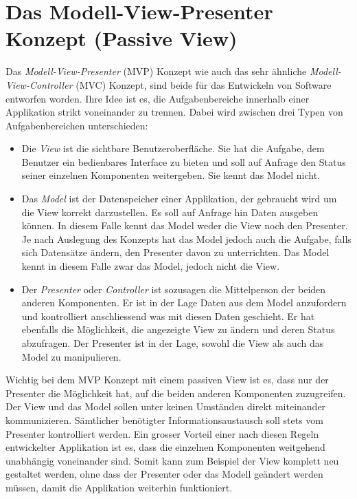 \documentclass[../main.tex]{subfiles}
\begin{document}
\section{Das Modell-View-Presenter Konzept (Passive View)} \label{mvp}
Das \emph{Modell-View-Presenter} (MVP) Konzept wie auch das sehr ähnliche \emph{Modell-View-Controller} (MVC) Konzept, sind beide für das Entwickeln von Software entworfen worden. Ihre Idee ist es, die Aufgabenbereiche innerhalb einer Applikation strikt voneinander zu trennen. Dabei wird zwischen drei Typen von Aufgabenbereichen unterschieden:
\begin{itemize}
	\item Die \emph{View} ist die sichtbare Benutzeroberfläche. Sie hat die Aufgabe, dem Benutzer ein bedienbares Interface zu bieten und soll auf Anfrage den Status seiner einzelnen Komponenten weitergeben. Sie kennt das Model nicht.
	\item Das \emph{Model} ist der Datenspeicher einer Applikation, der gebraucht wird um die View korrekt darzustellen. Es soll auf Anfrage hin Daten ausgeben können. In diesem Falle kennt das Model weder die View noch den Presenter. Je nach Auslegung des Konzepts hat das Model jedoch auch die Aufgabe, falls sich Datensätze ändern, den Presenter davon zu unterrichten. Das Model kennt in diesem Falle zwar das Model, jedoch nicht die View.
	\item Der \emph{Presenter} oder \emph{Controller} ist sozusagen die Mittelperson der beiden anderen Komponenten. Er ist in der Lage Daten aus dem Model anzufordern und kontrolliert anschliessend was mit diesen Daten geschieht. Er hat ebenfalls die Möglichkeit, die angezeigte View zu ändern und deren Status abzufragen. Der Presenter ist in der Lage, sowohl die View als auch das Model zu manipulieren.
\end{itemize}
Wichtig bei dem MVP Konzept mit einem passiven View ist es, dass nur der Presenter die Möglichkeit hat, auf die beiden anderen Komponenten zuzugreifen. Der View und das Model sollen unter keinen Umständen direkt miteinander kommunizieren. Sämtlicher benötigter Informationsaustausch soll stets vom Presenter kontrolliert werden. \cite{mvp} Ein grosser Vorteil einer nach diesen Regeln entwickelter Applikation ist es, dass die einzelnen Komponenten weitgehend unabhängig voneinander sind. Somit kann zum Beispiel der View komplett neu gestaltet werden, ohne dass der Presenter oder das Modell geändert werden müssen, damit die Applikation weiterhin funktioniert.
	
\end{document}
